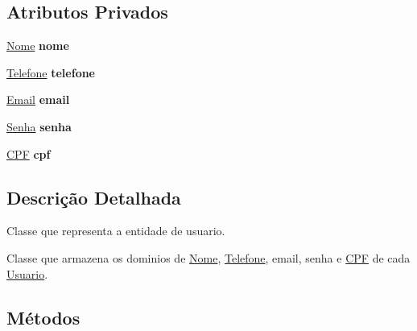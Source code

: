 \subsection*{Atributos Privados}
\begin{DoxyCompactItemize}
\item 
\hyperlink{classshibarides_1_1Nome}{Nome} {\bfseries nome}\hypertarget{classshibarides_1_1Usuario_a4a46b7e57b2d6326c109fe66126bfa46}{}\label{classshibarides_1_1Usuario_a4a46b7e57b2d6326c109fe66126bfa46}

\item 
\hyperlink{classshibarides_1_1Telefone}{Telefone} {\bfseries telefone}\hypertarget{classshibarides_1_1Usuario_a20bb9c94cf617afd44aa581a05c868bf}{}\label{classshibarides_1_1Usuario_a20bb9c94cf617afd44aa581a05c868bf}

\item 
\hyperlink{classshibarides_1_1Email}{Email} {\bfseries email}\hypertarget{classshibarides_1_1Usuario_a0ef5eb97055777068fea14380ca2b3c9}{}\label{classshibarides_1_1Usuario_a0ef5eb97055777068fea14380ca2b3c9}

\item 
\hyperlink{classshibarides_1_1Senha}{Senha} {\bfseries senha}\hypertarget{classshibarides_1_1Usuario_a4759f2777cbcbcd253b51018675dd02e}{}\label{classshibarides_1_1Usuario_a4759f2777cbcbcd253b51018675dd02e}

\item 
\hyperlink{classshibarides_1_1CPF}{C\+PF} {\bfseries cpf}\hypertarget{classshibarides_1_1Usuario_a30438f56fbd5fb38fa347c605f2fcf5a}{}\label{classshibarides_1_1Usuario_a30438f56fbd5fb38fa347c605f2fcf5a}

\end{DoxyCompactItemize}


\subsection{Descrição Detalhada}
Classe que representa a entidade de usuario. 

Classe que armazena os dominios de \hyperlink{classshibarides_1_1Nome}{Nome}, \hyperlink{classshibarides_1_1Telefone}{Telefone}, email, senha e \hyperlink{classshibarides_1_1CPF}{C\+PF} de cada \hyperlink{classshibarides_1_1Usuario}{Usuario}. 

\subsection{Métodos}
